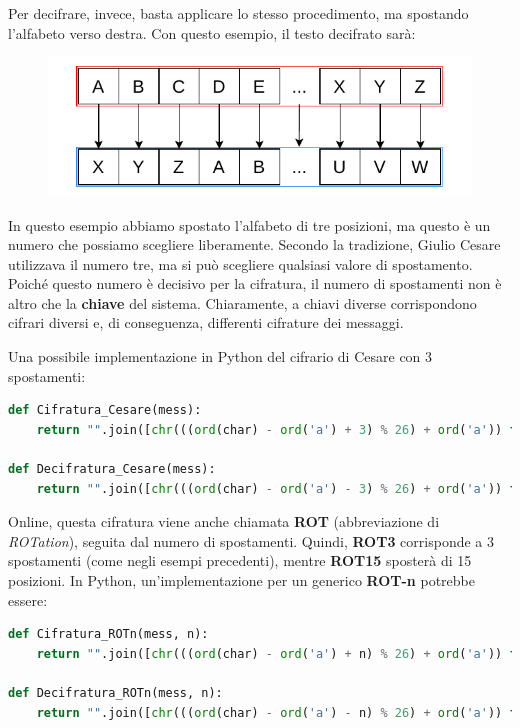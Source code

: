 \documentclass{rapport}
\begin{document}
Per decifrare, invece, basta applicare lo stesso procedimento, ma spostando l'alfabeto verso destra.  
Con questo esempio, il testo decifrato sarà:

\begin{figure}[h]
    \centering
    \includegraphics[width=0.8\linewidth]{logos/1_3_cripto.pdf}
\end{figure}


\newpage

In questo esempio abbiamo spostato l'alfabeto di tre posizioni, ma questo è un numero che possiamo scegliere liberamente.  
Secondo la tradizione, Giulio Cesare utilizzava il numero tre, ma si può scegliere qualsiasi valore di spostamento.  
Poiché questo numero è decisivo per la cifratura, il numero di spostamenti non è altro che la \textbf{chiave} del sistema.  
Chiaramente, a chiavi diverse corrispondono cifrari diversi e, di conseguenza, differenti cifrature dei messaggi.


Una possibile implementazione in Python del cifrario di Cesare con 3 spostamenti:

\begin{lstlisting}[language=Python]
def Cifratura_Cesare(mess):
    return "".join([chr(((ord(char) - ord('a') + 3) % 26) + ord('a')) for a in mess])

def Decifratura_Cesare(mess):
    return "".join([chr(((ord(char) - ord('a') - 3) % 26) + ord('a')) for a in mess])
\end{lstlisting}


Online, questa cifratura viene anche chiamata \textbf{ROT} (abbreviazione di \textit{ROTation}), seguita dal numero di spostamenti.  
Quindi, \textbf{ROT3} corrisponde a 3 spostamenti (come negli esempi precedenti), mentre \textbf{ROT15} sposterà di 15 posizioni.  
In Python, un'implementazione per un generico \textbf{ROT-n} potrebbe essere:


\begin{lstlisting}[language=Python]
def Cifratura_ROTn(mess, n):
    return "".join([chr(((ord(char) - ord('a') + n) % 26) + ord('a')) for a in mess])

def Decifratura_ROTn(mess, n):
    return "".join([chr(((ord(char) - ord('a') - n) % 26) + ord('a')) for a in mess])
\end{lstlisting}
\end{document}
